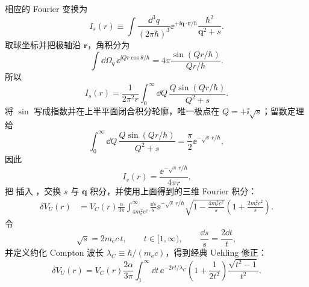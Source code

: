 \begin{derivation}
相应的 Fourier 变换为
\begin{equation*}
 I_s(r)
 \equiv
 \int\frac{\dd^3 q}{(2\pi\hbar)^3}
 \ee^{+\ii\mathbf q\cdot\mathbf r/\hbar}
 \frac{\hbar^2}{\mathbf q^2+s}.
\end{equation*}
取球坐标并把极轴沿 $\mathbf r$，角积分为
\begin{equation*}
 \int\dd\Omega_q\,\ee^{\ii Qr\cos\theta/\hbar}
 =4\pi\frac{\sin(Qr/\hbar)}{Qr/\hbar}.
\end{equation*}
所以
\begin{equation*}
 I_s(r)
 =\frac1{2\pi^2r}
 \int_0^\infty\dd Q\,
 \frac{Q\sin(Qr/\hbar)}{Q^2+s}.
\end{equation*}
将 $\sin$ 写成指数并在上半平面闭合积分轮廓，唯一极点在 $Q=+\ii\sqrt s$；留数定理给
\begin{equation*}
 \int_0^\infty\dd Q\,
 \frac{Q\sin(Qr/\hbar)}{Q^2+s}
 =\frac\pi2\ee^{-\sqrt s\,r/\hbar},
\end{equation*}
因此
\begin{equation*}
 {
 I_s(r)=\frac{\ee^{-\sqrt s\,r/\hbar}}{4\pi r}.}
 \end{equation*}
把  插入 ，交换 $s$ 与 $\mathbf q$ 积分，并使用上面得到的三维 Fourier 积分：
\begin{align*}
 \delta V_U(r)
 &=V_C(r)\frac{\alpha}{3\pi}
 \int_{4m_{\mathrm e}^2c^2}^{\infty}\frac{\dd s}{s}
 \ee^{-\sqrt s\,r/\hbar}
 \sqrt{1-\frac{4m_{\mathrm e}^2c^2}{s}}
 \left(1+\frac{2m_{\mathrm e}^2c^2}{s}\right).
\end{align*}
令
\begin{equation*}
 \sqrt s=2m_{\mathrm e} c\,t,
 \qquad t\in[1,\infty),
 \qquad \frac{\dd s}{s}=\frac{2\dd t}{t},
\end{equation*}
并定义约化 Compton 波长 $\lambda_C\equiv\hbar/(m_{\mathrm e} c)$，得到经典 Uehling 修正：
\begin{equation*}
 {
 \delta V_U(r)
 =V_C(r)\frac{2\alpha}{3\pi}
 \int_1^\infty\dd t\,
 \ee^{-2rt/\lambda_C}
 \left(1+\frac1{2t^2}\right)
 \frac{\sqrt{t^2-1}}{t^2}.}
 \end{equation*}
\end{derivation}

